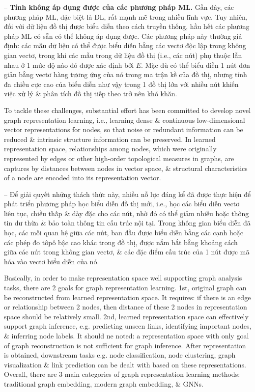 \documentclass{article}
\begin{document}
\begin{itemize}
\begin{itemize}
\begin{enumerate}
            -- {\bf Tính không áp dụng được của các phương pháp ML.} Gần đây, các phương pháp ML, đặc biệt là DL, rất mạnh mẽ trong nhiều lĩnh vực. Tuy nhiên, đối với dữ liệu đồ thị được biểu diễn theo cách truyền thống, hầu hết các phương pháp ML có sẵn có thể không áp dụng được. Các phương pháp này thường giả định: các mẫu dữ liệu có thể được biểu diễn bằng các vectơ độc lập trong không gian vectơ, trong khi các mẫu trong dữ liệu đồ thị (i.e., các nút) phụ thuộc lẫn nhau ở 1 mức độ nào đó được xác định bởi $E$. Mặc dù có thể biểu diễn 1 nút đơn giản bằng vectơ hàng tương ứng của nó trong ma trận kề của đồ thị, nhưng tính đa chiều cực cao của biểu diễn như vậy trong 1 đồ thị lớn với nhiều nút khiến việc xử lý \& phân tích đồ thị tiếp theo trở nên khó khăn.
        \end{enumerate}
        To tackle these challenges, substantial effort has been committed to develop novel graph representation learning, i.e., learning dense \& continuous low-dimensional vector representations for nodes, so that noise or redundant information can be reduced \& intrinsic structure information can be preserved. In learned representation space, relationships among nodes, which were originally represented by edges or other high-order topological measures in graphs, are captures by distances between nodes in vector space, \& structural characteristics of a node are encoded into its representation vector.

        -- Để giải quyết những thách thức này, nhiều nỗ lực đáng kể đã được thực hiện để phát triển phương pháp học biểu diễn đồ thị mới, i.e., học các biểu diễn vectơ liên tục, chiều thấp \& dày đặc cho các nút, nhờ đó có thể giảm nhiễu hoặc thông tin dư thừa \& bảo toàn thông tin cấu trúc nội tại. Trong không gian biểu diễn đã học, các mối quan hệ giữa các nút, ban đầu được biểu diễn bằng các cạnh hoặc các phép đo tôpô bậc cao khác trong đồ thị, được nắm bắt bằng khoảng cách giữa các nút trong không gian vectơ, \& các đặc điểm cấu trúc của 1 nút được mã hóa vào vectơ biểu diễn của nó.

        Basically, in order to make representation space well supporting graph analysis tasks, there are 2 goals for graph representation learning. 1st, original graph can be reconstructed from learned representation space. It requires: if there is an edge or relationship between 2 nodes, then distance of these 2 nodes in representation space should be relatively small. 2nd, learned representation space can effectively support graph inference, e.g. predicting unseen links, identifying important nodes, \& inferring node labels. It should ne noted: a representation space with only goal of graph reconstruction is not sufficient for graph inference. After representation is obtained, downstream tasks e.g. node classification, node clustering, graph visualization \& link prediction can be dealt with based on these representations. Overall, there are 3 main categories of graph representation learning methods: traditional graph embedding, modern graph embedding, \& GNNs.


\end{itemize}
\end{itemize}
\end{document}

